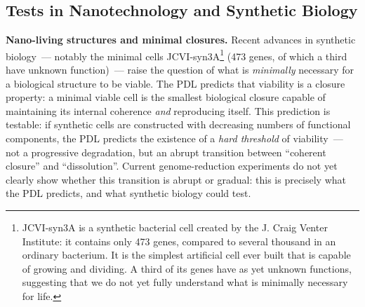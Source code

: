 \documentclass[12pt, a4paper, openright]{book}
\begin{document}
\subsection*{Tests in Nanotechnology and Synthetic Biology}

\textbf{Nano-living structures and minimal closures.} Recent advances in synthetic biology~--- notably the minimal cells JCVI-syn3A\footnote{JCVI-syn3A is a synthetic bacterial cell created by the J. Craig Venter Institute: it contains only 473 genes, compared to several thousand in an ordinary bacterium. It is the simplest artificial cell ever built that is capable of growing and dividing. A third of its genes have as yet unknown functions, suggesting that we do not yet fully understand what is minimally necessary for life.} (473 genes, of which a third have unknown function)~--- raise the question of what is \emph{minimally} necessary for a biological structure to be viable. The PDL predicts that viability is a closure property: a minimal viable cell is the smallest biological closure capable of maintaining its internal coherence \emph{and} reproducing itself. This prediction is testable: if synthetic cells are constructed with decreasing numbers of functional components, the PDL predicts the existence of a \emph{hard threshold} of viability~--- not a progressive degradation, but an abrupt transition between ``coherent closure'' and ``dissolution''. Current genome-reduction experiments do not yet clearly show whether this transition is abrupt or gradual: this is precisely what the PDL predicts, and what synthetic biology could test.

\medskip
\end{document}
